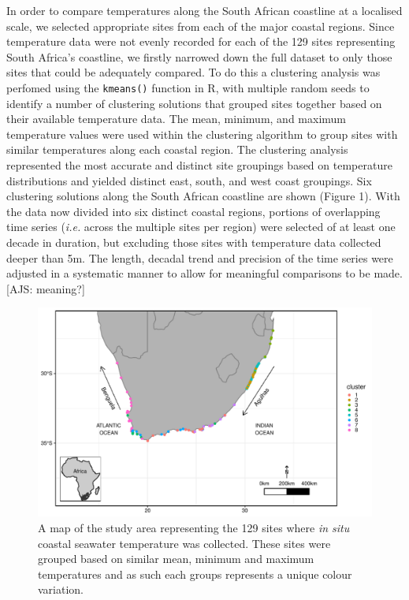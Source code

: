 \documentclass[12pt,a4paper,]{article}
\begin{document}
In order to compare temperatures along the South African coastline at a
localised scale, we selected appropriate sites from each of the major
coastal regions. Since temperature data were not evenly recorded for
each of the 129 sites representing South Africa's coastline, we firstly
narrowed down the full dataset to only those sites that could be
adequately compared. To do this a clustering analysis was perfomed using
the \texttt{kmeans()} function in R, with multiple random seeds to
identify a number of clustering solutions that grouped sites together
based on their available temperature data. The mean, minimum, and
maximum temperature values were used within the clustering algorithm to
group sites with similar temperatures along each coastal region. The
clustering analysis represented the most accurate and distinct site
groupings based on temperature distributions and yielded distinct east,
south, and west coast groupings. Six clustering solutions along the
South African coastline are shown (Figure 1). With the data now divided
into six distinct coastal regions, portions of overlapping time series
(\emph{i.e.} across the multiple sites per region) were selected of at
least one decade in duration, but excluding those sites with temperature
data collected deeper than 5m. The length, decadal trend and precision
of the time series were adjusted in a systematic manner to allow for
meaningful comparisons to be made. {[}AJS: meaning?{]}

\begin{figure}
\centering
\includegraphics{../figures/map_fixed.pdf}
\caption{A map of the study area representing the 129 sites where
\emph{in situ} coastal seawater temperature was collected. These sites
were grouped based on similar mean, minimum and maximum temperatures and
as such each groups represents a unique colour variation.}
\end{figure}
\end{document}
